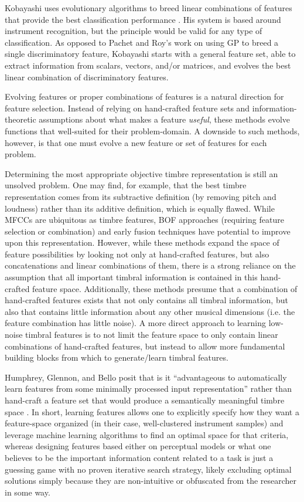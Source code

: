 \documentclass[12pt]{report} 	%
\numberwithin{figure}{chapter}
\numberwithin{table}{chapter}
\numberwithin{equation}{chapter}
\begin{document}
\begin{flushleft}
Kobayashi uses evolutionary algorithms to breed linear combinations of features that provide the best classification performance \cite{Kobayashi:2009la}. His system is based around instrument recognition, but the principle would be valid for any type of classification. As opposed to Pachet and Roy's work \cite{Pachet:2007if} on using GP to breed a single discriminatory feature, Kobayashi starts with a general feature set, able to extract information from scalars, vectors, and/or matrices, and evolves the best linear combination of discriminatory features.

Evolving features or proper combinations of features is a natural direction for feature selection. Instead of relying on hand-crafted feature sets and information-theoretic assumptions about what makes a feature \textit{useful}, these methods evolve functions that well-suited for their problem-domain. A downside to such methods, however, is that one must evolve a new feature or set of features for each problem.

Determining the most appropriate objective timbre representation is still an unsolved problem. One may find, for example, that the best timbre representation comes from its subtractive definition (by removing pitch and loudness) rather than its additive definition, which is equally flawed. While MFCCs are ubiquitous as timbre features, BOF approaches (requiring feature selection or combination) and early fusion techniques have potential to improve upon this representation. However, while these methods expand the space of feature possibilities by looking not only at hand-crafted features, but also concatenations and linear combinations of them, there is a strong reliance on the assumption that all important timbral information is contained in this hand-crafted feature space. Additionally, these methods presume that a combination of hand-crafted features exists that not only contains all timbral information, but also that contains little information about any other musical dimensions (i.e. the feature combination has little noise). A more direct approach to learning low-noise timbral features is to not limit the feature space to only contain linear combinations of hand-crafted features, but instead to allow more fundamental building blocks from which to generate/learn timbral features.

Humphrey, Glennon, and Bello posit that is it  ``advantageous to automatically learn features from some minimally processed input representation'' rather than hand-craft a feature set that would produce a semantically meaningful timbre space \cite{Humphrey:2000th}. In short, learning features allows one to explicitly specify how they want a feature-space organized (in their case, well-clustered instrument samples) and leverage machine learning algorithms to find an optimal space for that criteria, whereas designing features based either on perceptual models or what one believes to be the important information content related to a task is just a guessing game with no proven iterative search strategy, likely excluding optimal solutions simply because they are non-intuitive or obfuscated from the researcher in some way.


\end{flushleft}
\end{document}

